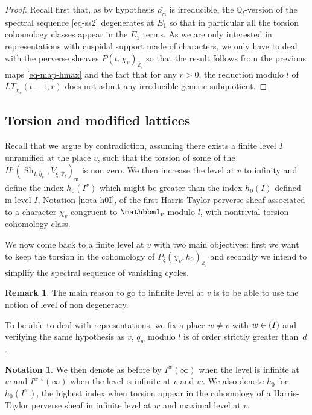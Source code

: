 \documentclass[JEP,XML,SOM,Unicode,published]{cedram}
\let\mathds\mathbbm
\newcommand{\NoChangel}[1]{%
\expandafter\let\csname old\string#1\endcsname=#1
\let#1=\relax
\newcommand{#1}{\mathcode`l="716C\csname old\string#1\endcsname\mathcode`l="7160 }%
}
\theoremstyle{plain}
\theoremstyle{definition}
\newtheorem*{remark}{Remark}
\newtheorem{nota}[equation]{Notation}
\numberwithin{equation}{subsection}
\newcommand\Qm{{\mathbb Q}}
\newcommand\Zm{{\mathbb Z}}
\DeclareMathOperator{\sh}{Sh}
\DeclareMathOperator{\spl}{Spl}\NoChangel{\spl}
\let \oo=\infty
\begin{document}
\begin{proof}
Recall first that, as by hypothesis $\overline{\rho_{\mathfrak m}}$ is irreducible, the
$\overline \Qm_l$-version of the spectral sequence \eqref{eq-ss2} degenerates at $E_1$ so
that in particular all the torsion cohomology classes appear in the $E_1$ terms.
As we are only interested in representations with cuspidal support made of characters,
we only have to deal with the perverse sheaves $P(t,\chi_v)_{\overline \Zm_l}$ so that the result
follows from the previous maps \eqref{eq-map-hmax} and the fact that for
any $r>0$, the reduction modulo $l$ of $LT_{\chi_v}(t-1,r)$ does not admit any irreducible
generic subquotient.
\end{proof}

\subsection{Torsion and modified lattices}
\label{para-modification}

Recall that we argue by contradiction, assuming there exists a finite level $I$
unramified at the place $v$, such that the torsion of some of
the $H^i(\sh_{I,\bar \eta_v},V_{\xi,\overline \Zm_l})_{\mathfrak m}$ is non
zero. We then increase the level at $v$ to infinity and define the index
$h_0(I^v)$ which might be greater than the index $h_0(I)$ defined in level $I$,
\cf Notation \ref{nota-h0I}, of the first Harris-Taylor perverse sheaf
associated to a character $\chi_v$ congruent to $\mathds 1_v$ modulo $l$,
with nontrivial torsion cohomology class.

We now come back to a finite level at $v$ with two main objectives:
first we want to keep the torsion in the cohomology of
$P_\xi(\chi_v,h_0)_{\overline \Zm_l}$ and secondly we intend to simplify the spectral sequence
of vanishing cycles.

\begin{remark}
The main reason to go to infinite level at $v$ is to be able to use
the notion of level of non degeneracy.

To be able to deal with representations, we fix a place $w \neq v$
with $w \in \spl(I)$ and verifying the
same hypothesis as $v$, \ie $q_w$ modulo $l$ is of order strictly greater than~$d$.
\end{remark}

\begin{nota}
We then denote as before by $I^w(\oo)$ when the level is infinite at~$w$ and
$I^{w,v}(\oo)$ when the level is infinite at $v$ and $w$. We also denote $h_0$
for $h_0(I^w)$, the highest index when torsion appear in the cohomology of
a Harris-Taylor perverse sheaf in infinite level at $w$ and maximal level at $v$.
\end{nota}
\end{document}
